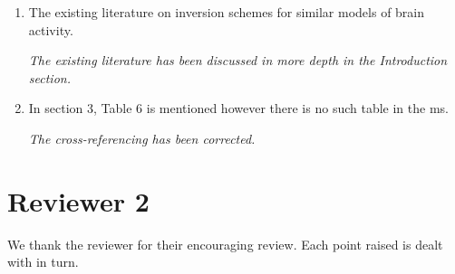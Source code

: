 \documentclass{article}
\begin{document}
\begin{enumerate}
        \item The existing literature on inversion schemes for similar models of brain activity.

\emph{The existing literature has been discussed in more depth in the Introduction section.}

        \item In section 3, Table 6 is mentioned however there is no such table in the ms.

\emph{The cross-referencing has been corrected.}

    \end{enumerate}
    
    \section{Reviewer 2}
    
    We thank the reviewer for their encouraging review. Each point raised is dealt with in turn.
\end{document}
